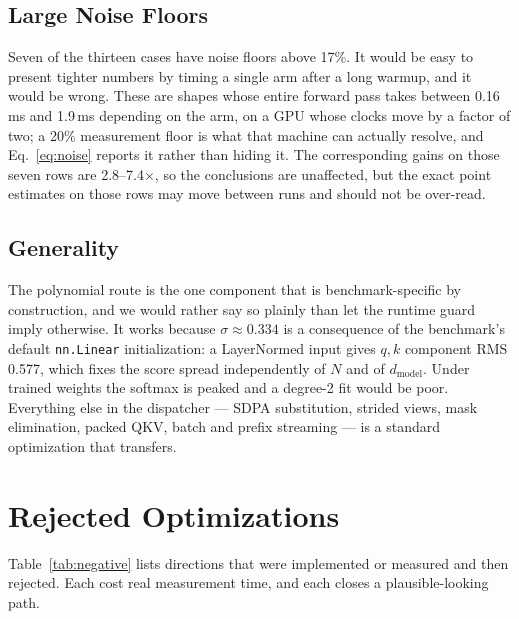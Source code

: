 \documentclass[10pt,conference,compsoc]{IEEEtran}
\begin{document}
\subsection{Large Noise Floors}
Seven of the thirteen cases have noise floors above 17\%. It would be easy to present tighter numbers by timing a single arm after a long warmup, and it would be wrong. These are shapes whose entire forward pass takes between 0.16\,ms and 1.9\,ms depending on the arm, on a GPU whose clocks move by a factor of two; a 20\% measurement floor is what that machine can actually resolve, and Eq.~\ref{eq:noise} reports it rather than hiding it. The corresponding gains on those seven rows are 2.8--7.4$\times$, so the conclusions are unaffected, but the exact point estimates on those rows may move between runs and should not be over-read.

\subsection{Generality}
The polynomial route is the one component that is benchmark-specific by construction, and we would rather say so plainly than let the runtime guard imply otherwise. It works because $\sigma \approx 0.334$ is a consequence of the benchmark's default \texttt{nn.Linear} initialization: a LayerNormed input gives $q,k$ component RMS 0.577, which fixes the score spread independently of $N$ and of $d_\text{model}$. Under trained weights the softmax is peaked and a degree-2 fit would be poor. Everything else in the dispatcher --- SDPA substitution, strided views, mask elimination, packed QKV, batch and prefix streaming --- is a standard optimization that transfers.

\section{Rejected Optimizations}
\label{sec:negative}
Table~\ref{tab:negative} lists directions that were implemented or measured and then rejected. Each cost real measurement time, and each closes a plausible-looking path.
\end{document}
